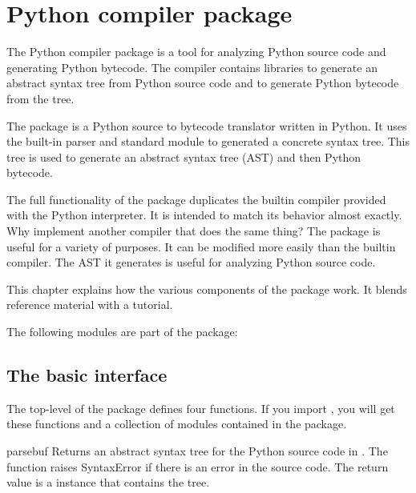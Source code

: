\chapter{Python compiler package \label{compiler}}



The Python compiler package is a tool for analyzing Python source code
and generating Python bytecode.  The compiler contains libraries to
generate an abstract syntax tree from Python source code and to
generate Python bytecode from the tree.

The  package is a Python source to bytecode
translator written in Python.  It uses the built-in parser and
standard  module to generated a concrete syntax
tree.  This tree is used to generate an abstract syntax tree (AST) and
then Python bytecode.

The full functionality of the package duplicates the builtin compiler
provided with the Python interpreter.  It is intended to match its
behavior almost exactly.  Why implement another compiler that does the
same thing?  The package is useful for a variety of purposes.  It can
be modified more easily than the builtin compiler.  The AST it
generates is useful for analyzing Python source code.

This chapter explains how the various components of the
 package work.  It blends reference material with
a tutorial.

The following modules are part of the  package:

\localmoduletable


\section{The basic interface}


The top-level of the package defines four functions.  If you import
, you will get these functions and a collection of
modules contained in the package.

\begin{funcdesc}{parse}{buf}
Returns an abstract syntax tree for the Python source code in .
The function raises SyntaxError if there is an error in the source
code.  The return value is a  instance that
contains the tree.  
\end{funcdesc}

